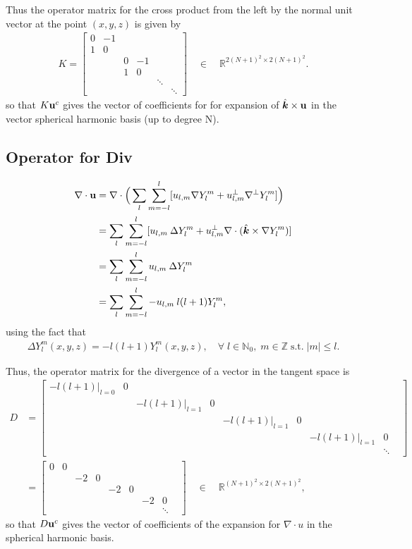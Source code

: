 \documentclass[11pt, oneside]{article}   	%
\newcommand{\R}{\mathbb{R}}
\newcommand{\Z}{\mathbb{Z}}
\newcommand{\No}{\mathbb{N}_0}
\newcommand{\Ylm}{Y^m_l}
\newcommand{\gradYlm}{\nabla Y^m_l}
\newcommand{\gradpYlm}{\nabla^\perp Y^m_l}
\newcommand{\unitvec}{\hat{\bm{k}}}
\begin{document}
Thus the operator matrix for the cross product from the left by the normal unit vector at the point \((x,y,z)\) is given by
\begin{align}
K =  \begin{bmatrix}
		0 & -1 & & & & \\
		1 & 0 & & & & \\
		& & 0 & -1 & & \\
		& & 1 & 0 & & \\
		& & & & \ddots \\
		& & & & & \ddots 
	  \end{bmatrix} \quad \in \quad \R^{2(N+1)^2 \times 2(N+1)^2}.
\end{align}
so that \(K\bold{u}^c\) gives the vector of coefficients for for expansion of \(\unitvec \times \bold{u}\) in the vector spherical harmonic basis (up to degree N).

\subsection{Operator for Div}
\begin{align}
\nabla \cdot \bold{u} &= \nabla \cdot \Big( \sum_l \sum_{m=-l}^{l} [ u_{l,m} \gradYlm + u^{\perp}_{l,m} \gradpYlm ] \Big) \\
&= \sum_l \sum_{m=-l}^{l} [ u_{l,m} \: \Delta \Ylm + u^{\perp}_{l,m} \nabla \cdot (\unitvec \times \gradYlm) ] \\
&= \sum_l \sum_{m=-l}^{l} u_{l,m} \: \Delta \Ylm \\
&= \sum_l \sum_{m=-l}^{l} - u_{l,m} \: l(l+1) \Ylm, \\
\end{align}
using the fact that 
\begin{align}
\Delta \Ylm(x,y,z) = -l(l+1)\Ylm(x,y,z), \quad \forall \; l \in \No, \; m \in \Z \; \text{s.t.} \; |m| \le l.
\end{align}

Thus, the operator matrix for the divergence of a vector in the tangent space is
\begin{align}
D &=  \begin{bmatrix}
		-l(l+1)|_{l=0} & 0 & & & & & & & \\
		& & -l(l+1)|_{l=1} & 0 & & & & & \\
		& & & & -l(l+1)|_{l=1} & 0 & & & \\
		& & & & & & -l(l+1)|_{l=1} & 0 & \\
		& & & & & & & \ddots 
	  \end{bmatrix} \\
	  &=  \begin{bmatrix}
		0 & 0 & & & & & & & \\
		& & -2 & 0 & & & & & \\
		& & & & -2 & 0 & & & \\
		& & & & & & -2 & 0 & \\
		& & & & & & & \ddots 
	  \end{bmatrix} \quad \in \quad \R^{(N+1)^2 \times 2(N+1)^2},
\end{align}
so that \(D\bold{u}^c\) gives the vector of coefficients of the expansion for \(\nabla \cdot u\) in the spherical harmonic basis.
\end{document}
